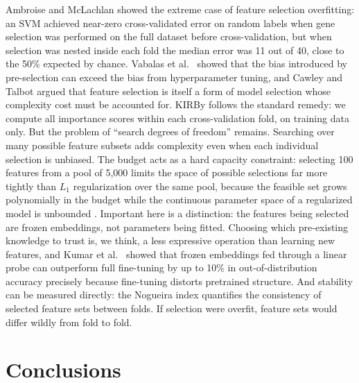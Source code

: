 {%
Ambroise and McLachlan \citep{Ambroise2002} showed the extreme case of feature selection overfitting: an SVM achieved near-zero cross-validated error on random labels when gene selection was performed on the full dataset before cross-validation, but when selection was nested inside each fold the median error was 11 out of 40, close to the 50\% expected by chance. Vabalas et al.\ \citep{Vabalas2019} showed that the bias introduced by pre-selection can exceed the bias from hyperparameter tuning, and Cawley and Talbot \citep{Cawley2010} argued that feature selection is itself a form of model selection whose complexity cost must be accounted for. KIRBy follows the standard remedy: we compute all importance scores within each cross-validation fold, on training data only. But the problem of ``search degrees of freedom'' \citep{Tibshirani2015} remains. Searching over many possible feature subsets adds complexity even when each individual selection is unbiased. The budget acts as a hard capacity constraint: selecting 100 features from a pool of 5,000 limits the space of possible selections far more tightly than $L_1$ regularization over the same pool, because the feasible set grows polynomially in the budget while the continuous parameter space of a regularized model is unbounded \citep{Ng2004}. Important here is a distinction: the features being selected are frozen embeddings, not parameters being fitted. Choosing which pre-existing knowledge to trust is, we think, a less expressive operation than learning new features, and Kumar et al.\ \citep{Kumar2022} showed that frozen embeddings fed through a linear probe can outperform full fine-tuning by up to 10\% in out-of-distribution accuracy precisely because fine-tuning distorts pretrained structure. And stability can be measured directly: the Nogueira index \citep{Nogueira2018} quantifies the consistency of selected feature sets between folds. If selection were overfit, feature sets would differ wildly from fold to fold.

\section{Conclusions}


}
